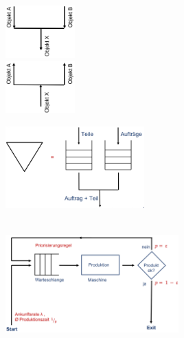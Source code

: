 \begin{multicols}{2}
	\begin{multicols}{2}
		\includegraphics[width=0.2\textwidth]{pictures/fluss_gabelung1}\\ 
		\includegraphics[width=0.2\textwidth]{pictures/fluss_gabelung2}
	\end{multicols}
	\includegraphics[width=0.4\textwidth]{pictures/fluss_lager}
\end{multicols}
\begin{example} \\
	\includegraphics[width=0.5\textwidth]{pictures/flussdiagramm}
\end{example}

